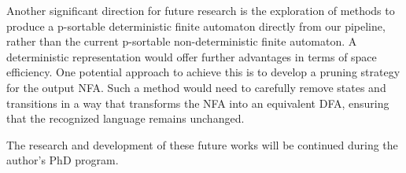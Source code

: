 Another significant direction for future research is the exploration of methods to produce a p-sortable deterministic finite automaton directly from our pipeline, rather than the current p-sortable non-deterministic finite automaton. A deterministic representation would offer further advantages in terms of space efficiency. One potential approach to achieve this is to develop a pruning strategy for the output NFA. Such a method would need to carefully remove states and transitions in a way that transforms the NFA into an equivalent DFA, ensuring that the recognized language remains unchanged.

The research and development of these future works will be continued during the author's PhD program.